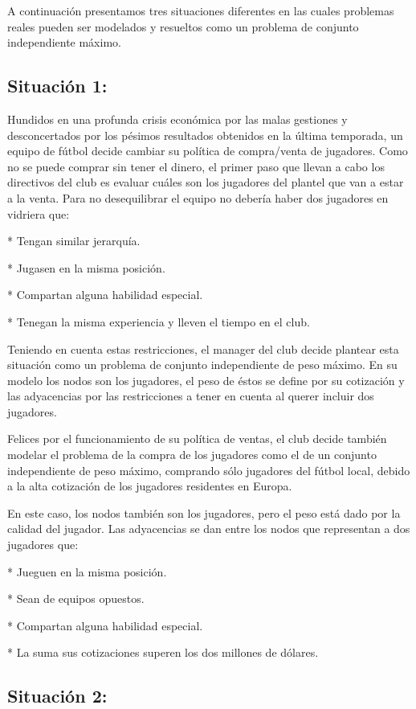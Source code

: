\documentclass[a4paper,11pt] {article}
\begin{document}
A continuación presentamos tres situaciones diferentes en las cuales problemas reales pueden ser modelados y resueltos como un problema de conjunto independiente máximo.

\subsection*{Situación 1:}

Hundidos en  una profunda crisis económica por las malas gestiones y desconcertados por los pésimos resultados obtenidos en la última temporada, un equipo de fútbol decide cambiar su política de compra/venta de jugadores. Como no se puede comprar sin tener el dinero, el primer paso que llevan a cabo los directivos del club es evaluar cuáles son los jugadores del plantel que van a estar a la venta. 
Para no desequilibrar el equipo no debería haber dos jugadores en vidriera que:
	
	* Tengan similar jerarquía.

	* Jugasen en la misma posición.

	* Compartan alguna habilidad especial.

	* Tenegan la misma experiencia y lleven el tiempo en el club.
\bigskip

Teniendo en cuenta estas restricciones, el manager del club decide plantear esta situación como un problema de conjunto independiente de peso máximo. En su modelo los nodos son los jugadores, el peso de éstos se define por su cotización y las adyacencias por las restricciones a tener en cuenta al querer incluir dos jugadores.
\bigskip

Felices por el funcionamiento de su política de ventas, el club decide también modelar el problema de la compra de los jugadores como el de un conjunto independiente de peso máximo, comprando sólo jugadores del fútbol local, debido a la alta cotización de los jugadores residentes en Europa.

En este caso, los nodos también son los jugadores, pero el peso está dado por la calidad del jugador. Las adyacencias se dan entre los nodos que representan a dos jugadores que:

	* Jueguen en la misma posición.

	* Sean de equipos opuestos.

	* Compartan alguna habilidad especial.

	* La suma sus cotizaciones superen los dos millones de dólares.

\subsection*{Situación 2:}
\end{document}
